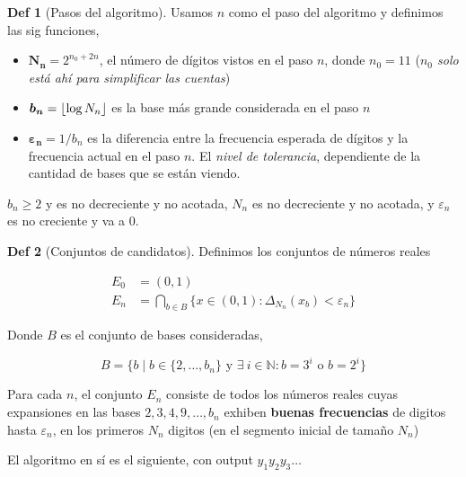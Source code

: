 \documentclass{article}
\DeclarePairedDelimiter\floor{\lfloor}{\rfloor}
\theoremstyle{definition} %
\newtheorem*{definition*}{Def}
\begin{document}
\begin{definition*}[Pasos del algoritmo]
    Usamos $n$ como el paso del algoritmo y definimos las sig funciones,
    
    \begin{itemize}
        \item[] $\bm{N_n} = 2^{n_0 + 2n}$, el número de dígitos vistos en el paso
        $n$, donde $n_0 = 11$ (\textit{$n_0$ solo está ahí para simplificar las
        cuentas})
        
        \item[] $\bm{b_n} = \floor{\log{N_n}}$ es la base más grande considerada en
        el paso $n$

        \item[] $\bm{\varepsilon_n} = 1/b_n$ es la diferencia entre la
        frecuencia esperada de dígitos y la frecuencia actual en el paso $n$. El
        \textit{nivel de tolerancia}, dependiente de la cantidad de bases que se
        están viendo.
    \end{itemize}

    $b_n \geq 2$ y es no decreciente y no acotada, $N_n$ es no decreciente y no
    acotada, y $\varepsilon_n$ es no creciente y va a 0.
\end{definition*}

\begin{definition*}[Conjuntos de candidatos]
    Definimos los conjuntos de números reales

    \begin{align*}
        E_0 &= (0, 1) \\
        E_n &= \bigcap_{b \in B }
            \{ x \in (0, 1) : \Delta_{N_n} (x_b) < \varepsilon_n \}
    \end{align*}

    Donde $B$ es el conjunto de bases consideradas,

    \[
        B = \{ 
            b \mid b \in \{ 2, \dots, b_n \} \text{ y }
            \exists\ i \in \mathbb{N} : b = 3^i \text{ o } b = 2^i
        \}
    \]

    Para cada $n$, el conjunto $E_n$ consiste de todos los números reales cuyas
    expansiones en las bases $2, 3, 4, 9, \dots, b_n$ exhiben \textbf{buenas
    frecuencias} de digitos hasta $\varepsilon_n$, en los primeros $N_n$ digitos
    (en el segmento inicial de tamaño $N_n$)
\end{definition*}

El algoritmo en sí es el siguiente, con output $y_1 y_2 y_3 \dots$
\end{document}
